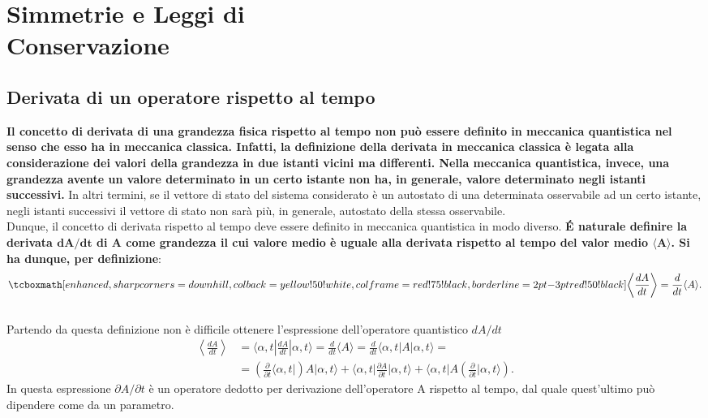 \chapter[Simmetrie e Leggi di Conservazione]{Simmetrie e Leggi di\\ Conservazione} 
\section{Derivata di un operatore rispetto al tempo} 

\textbf{Il concetto di derivata di una grandezza fisica rispetto al tempo non può essere definito in meccanica quantistica nel senso che esso ha in meccanica classica. Infatti, la definizione della derivata in meccanica classica è legata alla considerazione dei valori della grandezza in due istanti vicini ma differenti. Nella meccanica quantistica, invece, una grandezza avente un valore determinato in un certo istante non ha, in generale, valore determinato negli istanti successivi.} In altri termini, se il vettore di stato del sistema considerato è un autostato di una determinata osservabile ad un certo istante, negli istanti successivi il vettore di stato non sarà più, in generale, autostato della stessa osservabile.\\

Dunque, il concetto di derivata rispetto al tempo deve essere definito in meccanica quantistica in modo diverso.
\textbf{\'E naturale definire la derivata $\mathbf{{dA}/{dt}}$ di A come grandezza il cui valore medio è uguale alla derivata rispetto al tempo del valor medio $\mathbf{\langle A \rangle} $.
Si ha dunque, per definizione}:
	\begin{equation}
		\tcboxmath[enhanced, sharp corners=downhill, colback=yellow!50!white, colframe=red!75!black, borderline={2pt}{-3pt}{red!50!black}]{
		\left\langle \frac{dA}{dt} \right\rangle = \frac{d}{dt} \langle A \rangle .
		}
	\end{equation}\\

Partendo da questa definizione non è difficile ottenere l'espressione dell'operatore quantistico $dA/dt$
	\begin{align}
	\label{eq:cap12_1}
	\left\langle \frac{dA}{dt} \right\rangle &= \langle \alpha,t| \frac{dA}{dt}| \alpha,t \rangle = \frac{d}{dt} \langle A \rangle = \frac{d}{dt} \langle \alpha ,t |A| \alpha ,t\rangle= \nonumber\\
	&=\left(\frac{\partial }{\partial{t}}\langle \alpha,t|\right) A|\alpha,t \rangle + \langle \alpha,t| \frac{\partial A}{\partial{t}}|\alpha,t \rangle + \langle\alpha,t|A \left(\frac{\partial }{\partial{t}}|\alpha,t\rangle\right).
	\end{align} 
In questa espressione ${\partial A}/{\partial{t}}$ è un operatore dedotto per derivazione dell'operatore A rispetto al tempo, dal quale quest'ultimo può dipendere come da un parametro.\\


